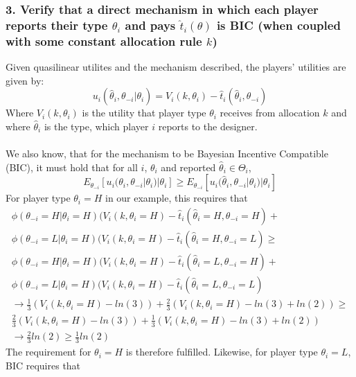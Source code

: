 \documentclass[a4paper]{article}
\begin{document}
	\subsubsection*{3. Verify that a direct mechanism in which each player reports their type $\theta_{i}$ and pays $\hat{t}_{i}(\theta)$ is BIC (when
		coupled with some constant allocation rule $k$)}
	Given quasilinear utilites and the mechanism described, the players' utilities are given by:
	\begin{equation}
		u_{i}(\hat{\theta}_{i},\theta_{-i}|\theta_{i})=V_{i}(k,\theta_{i}) - \hat{t}_{i}(\hat{\theta}_{i},\theta_{-i})
	\end{equation}
	Where $V_{i}(k,\theta_{i})$ is the utility that player type $\theta_{i}$ receives from allocation $k$ and where $\hat{\theta}_{i}$ is the type, which player $i$ reports to the designer.\\\\
	We also know, that for the mechanism to be Bayesian Incentive Compatible (BIC), it must hold that for all $i$, $\theta_{i}$ and reported $\hat{\theta}_{i}\in\Theta_i$,
	\begin{equation}
		E_{\theta_{-i}}[u_{i}(\theta_{i},\theta_{-i}|\theta_{i})|\theta_{i}] \geq E_{\theta_{-i}}[u_{i}(\hat{\theta}_{i},\theta_{-i}|\theta_{i})|\theta_{i}]
	\end{equation}
	For player type $\theta_{i}=H$ in our example, this requires that
	\begin{align}
		\phi(\theta_{-i}=H|\theta_{i}=H)(V_{i}(k,\theta_{i}=H)-\hat{t}_{i}(\hat{\theta}_{i}=H,\theta_{-i}=H) + \nonumber \\\phi(\theta_{-i}=L|\theta_{i}=H)(V_{i}(k,\theta_{i}=H)-\hat{t}_{i}(\hat{\theta}_{i}=H,\theta_{-i}=L) \geq \nonumber\\
		\phi(\theta_{-i}=H|\theta_{i}=H)(V_{i}(k,\theta_{i}=H)-\hat{t}_{i}(\hat{\theta}_{i}=L,\theta_{-i}=H) + \nonumber \\\phi(\theta_{-i}=L|\theta_{i}=H)(V_{i}(k,\theta_{i}=H)-\hat{t}_{i}(\hat{\theta}_{i}=L,\theta_{-i}=L)\\
		\rightarrow \frac{1}{3}(V_{i}(k,\theta_{i}=H)-ln(3))+\frac{2}{3}(V_{i}(k,\theta_{i}=H)-ln(3)+ln(2)) \geq \nonumber\\ \frac{2}{3}(V_{i}(k,\theta_{i}=H)-ln(3))+\frac{1}{3}(V_{i}(k,\theta_{i}=H)-ln(3)+ln(2))\\
		\rightarrow \frac{2}{3}ln(2) \geq \frac{1}{3}ln(2)
	\end{align}
	The requirement for $\theta_{i}=H$ is therefore fulfilled. Likewise, for player type $\theta_{i}=L$, BIC requires that
\end{document}
